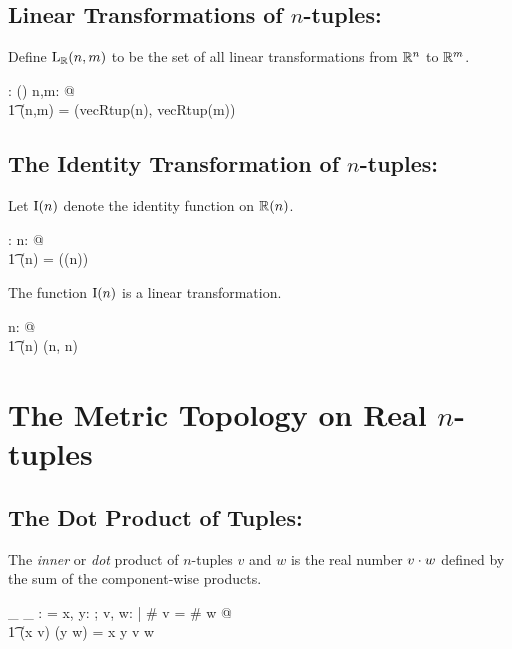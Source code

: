 \documentclass[11pt, oneside]{article}
\begin{document}
\subsection{Linear Transformations of $n$-tuples: }

Define $\operatorname{L_{\mathbb{R}}}(n,m)$ to be the set of all linear transformations from $\mathbb{R}^n$ to $\mathbb{R}^m$.
\begin{axdef}
	\linRtup: \nat \cross \nat \fun \power(\Rinf \pfun \Rinf)
\where
	\forall n,m: \nat @ \\
	\t1	\linRtup(n,m) = \homVecR(vecRtup(n), vecRtup(m))
\end{axdef}

\subsection{The Identity Transformation of $n$-tuples: }

Let $\operatorname{I}(n)$ denote the identity function on $\operatorname{\mathbb{R}}(n)$.

\begin{axdef}
	\idRtup: \nat \fun \Rinf \pfun \Rinf
\where
	\forall n: \nat @ \\
	\t1	\idRtup(n) = \id(\Rtup(n))
\end{axdef}

\begin{remark}
The function $\operatorname{I}(n)$ is a linear transformation.

\begin{zed}
	\forall n: \nat @ \\
	\t1	\idRtup(n) \in \linRtup(n, n)
\end{zed}

\end{remark}

\section{The Metric Topology on Real $n$-tuples}

\subsection{The Dot Product of Tuples: }

The {\it inner} or {\it dot} product of $n$-tuples $v$ and $w$ is the real number $v \mathbin{\cdot} w$ 
defined by the sum of the component-wise products.

\begin{axdef}
	\_ \dotRinf \_ : \RinfDelta \fun \R
\where
	\langle \rangle \dotRinf \langle \rangle = \zeroR
\also
	\forall x, y: \R; v, w: \Rinf | \# v = \# w @ \\
	\t1	(\langle x \rangle \cat v) \dotRinf (\langle y \rangle \cat w) = x \mulR y \addR v \dotRinf w
\end{axdef}
\end{document}

